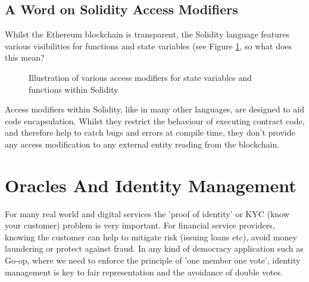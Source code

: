 \subsection{A Word on Solidity Access Modifiers}
Whilst the Ethereum blockchain is transparent, the Solidity language features various visibilities for functions and state variables (see Figure \ref{fig:AccessModifiers}, so what does this mean? \\
\begin{figure}
\centering
{}
\decoRule
\caption[Solidity Access Modifiers]{Illustration of various access modifiers for state variables and functions within Solidity}
\label{fig:AccessModifiers}
\end{figure}
Access modifiers within Solidity, like in many other languages, are designed to aid code encapsulation. Whilst they restrict the behaviour of executing contract code, and therefore help to catch bugs and errors at compile time, they don't provide any access modification to any external entity reading from the blockchain.\\

\section{Oracles And Identity Management}
\label{sec:identity}
For many real world and digital services the 'proof of identity' or KYC (know your customer) problem is very important. For financial service providers, knowing the customer can help to mitigate risk (issuing loans etc), avoid money laundering or protect against fraud. In any kind of democracy application such as Go-op, where we need to enforce the principle of 'one member one vote', identity management is key to fair representation and the avoidance of double votes.\\

